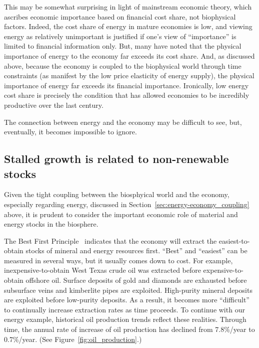 This may be somewhat surprising in light of mainstream economic theory, 
which ascribes economic importance 
based on financial cost share, 
not biophysical factors. 
Indeed, the cost share of energy in mature economies is low, 
and viewing energy as relatively unimportant is justified if
one's view of ``importance'' is limited to financial information only.
But, many have noted that the physical importance of energy to the economy 
far exceeds its cost share.\cite{Ayres:2013aa}
And, as discussed above, because the economy is coupled 
to the biophysical world through time constraints (as manifest 
by the low price elasticity of energy supply), 
the physical importance of energy far exceeds its financial importance.
Ironically, low energy cost share 
is precisely the condition that 
has allowed economies to be incredibly productive over the last century.

The connection between energy and the economy may be difficult to see, 
but, eventually, it becomes impossible to ignore.


\subsection{Stalled growth is related to non-renewable stocks}
\label{sec:stall_non-renewable_stocks}

Given the tight coupling between the biosphyical world and the economy,
especially regarding energy,
discussed in Section~\ref{sec:energy-economy_coupling} above,
it is prudent to consider the important economic role of
material and energy stocks in the biosphere.

The Best First Principle~\cite{Cleveland:2008aa}
indicates that the economy will extract the easiest-to-obtain 
stocks of mineral and energy resources first.
``Best'' and ``easiest'' can be measured in several ways, 
but it usually comes down to cost.
For example, inexpensive-to-obtain West Texas crude oil was extracted
before expensive-to-obtain offshore oil. 
Surface deposits of gold and diamonds are exhausted before subsurface
veins and kimberlite pipes are exploited.
High-purity mineral deposits are exploited before low-purity deposits.
As a result, it becomes more ``difficult'' to continually increase
extraction rates as time proceeds.
To continue with our energy example,
historical oil production trends reflect these realities.
Through time, the annual rate of increase of oil production
has declined from 7.8\%/year to 0.7\%/year.
(See Figure~\ref{fig:oil_production}.)

